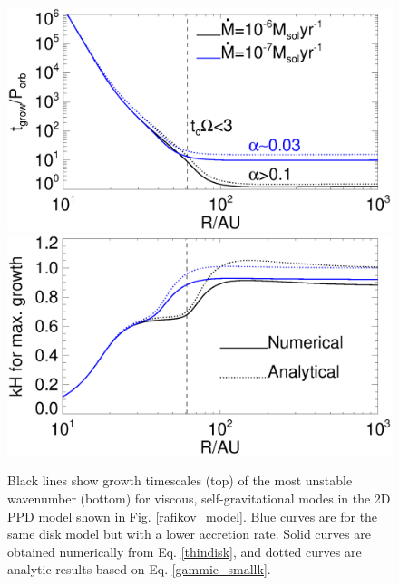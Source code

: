 \begin{figure}
  \includegraphics[width=\linewidth,clip=true,trim=0cm 2cm 0cm
    0.0cm]{figures/ppd_2d_growth}\\
  \includegraphics[width=\linewidth,clip=true,trim=0cm 0cm 0cm
    0.cm]{figures/ppd_2d_maxk}
  \caption{Black lines show growth timescales (top) of the most
    unstable wavenumber (bottom) for viscous, 
    self-gravitational modes in the 2D PPD model shown in
    Fig. \ref{rafikov_model}. Blue curves are for the same disk
    model but with a lower accretion rate. Solid curves are obtained
    numerically from Eq. \ref{thindisk}, and dotted curves 
    are analytic results based on Eq. \ref{gammie_smallk}. 
    \label{rafikov_growth}}
\end{figure}

